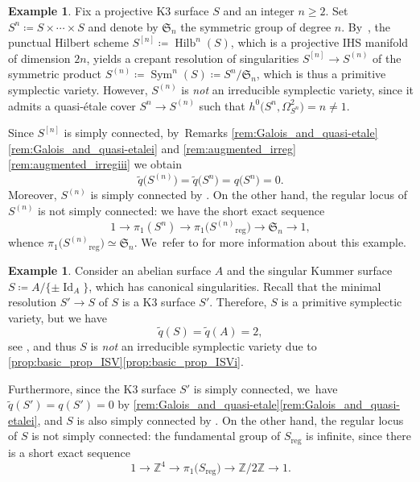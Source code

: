 \documentclass[JEP,XML,SOM,Unicode,published]{cedram}
\theoremstyle{plain}
\theoremstyle{definition}
\newtheorem{exa}[thm]{Example}
\newcommand{\Z}{\mathbb{Z}}
\DeclareMathOperator{\Id}{Id}
\DeclareMathOperator{\Hilb}{Hilb}
\DeclareMathOperator{\Sym}{Sym}
\begin{document}
\begin{exa}
\label{example:symmetric_product_K3s}
Fix a projective K3 surface $S$ and an integer $n \geq 2$. Set $S^n \coloneqq S \times \cdots \times S$ and denote by $\mathfrak{S}_n$ the symmetric group of degree $n$. By~\cite[\S 6]{Beauville83a}, the punctual Hilbert scheme $S^{[n]} \coloneqq \Hilb^n(S)$, which is a projective IHS manifold of dimension $2n$, yields a crepant resolution of singularities $S^{[n]} \to S^{(n)}$ of the symmetric product $S^{(n)} \coloneqq \Sym^n(S) \coloneqq S^n / \mathfrak{S}_n$, which is thus a primitive symplectic variety.
However, $S^{(n)}$ is \emph{not} an irreducible symplectic variety, since it admits a quasi-étale cover $S^n \to S^{(n)}$ such that $h^0 \bigl(S^n,\Omega^2_{S^n} \bigr) = n \neq 1$.

Since $S^{[n]}$ is simply connected, by~Remarks \ref{rem:Galois_and_quasi-etale}\eqref{rem:Galois_and_quasi-etalei} and \ref{rem:augmented_irreg}\eqref{rem:augmented_irregiii} we obtain
\[
\widetilde{q} \bigl(S^{(n)} \bigr) = \widetilde{q} \bigl(S^n \bigr) = q \bigl(S^n \bigr) = 0.
\]
Moreover, $S^{(n)}$ is simply connected by \cite[\S 6, Lem.\,1]{Beauville83a}. On the other hand, the regular locus of $S^{(n)}$ is not simply connected: we have the short exact sequence
\[
1 \to \pi_1(S^n) \to \pi_1 \bigl({S^{(n)}}_\text{reg} \bigr) \to \mathfrak{S}_n \to 1,
\]
whence $\pi_1 \bigl({S^{(n)}}_\text{reg} \bigr) \simeq \mathfrak{S}_n$. We~refer to \cite[p.\,156 (symmetric products of K3 surfaces), p.\ 164 (paragraph\ after the proof of Prop.\,3), \& Prop.\,5]{Perego20} for more information about this example.
\end{exa}

\begin{exa}
\label{example:singular_Kummer_surface}
Consider an abelian surface $A$ and the singular Kummer surface $S \coloneqq A / \{ \pm \Id_A \}$, which has canonical singularities.
Recall that the minimal resolution $S' \to S$ of $S$ is a K3 surface $S'$. Therefore, $S$ is a primitive symplectic variety, but we have
\[
\widetilde{q}(S) = \widetilde{q}(A) = 2,
\]
see \cite[Lem.\,2.19]{GGK19}, and thus $S$ is \emph{not} an irreducible symplectic variety due to \autoref{prop:basic_prop_ISV}\eqref{prop:basic_prop_ISVi}.

Furthermore, since the K3 surface $S'$ is simply connected, we~have \hbox{$\widetilde{q}(S') \!=\! q(S') \!=\! 0$} by \autoref{rem:Galois_and_quasi-etale}\eqref{rem:Galois_and_quasi-etalei}, and $S$ is also simply connected by \cite[Th.\,1.1]{Tak03}. On the other hand, the regular locus of $S$ is not simply connected: the fundamental group of $S_\text{reg}$ is infinite, since there is a short exact sequence
\[
1 \to \Z^4 \to \pi_1 \bigl(S_\text{reg} \bigr) \to \Z / 2\Z \to 1.
\]
\end{exa}
\end{document}

